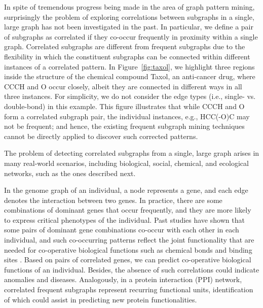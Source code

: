 {In spite of tremendous progress being made in the area of graph pattern mining, surprisingly the problem of exploring correlations between subgraphs
in a single, large graph has not been investigated in the past. In particular, we define a pair of subgraphs as correlated if
they co-occur frequently in proximity within a single graph. Correlated subgraphs are different from frequent subgraphs due to
the flexibility in which the constituent subgraphs can be connected within different instances of a correlated pattern. In Figure~\ref{fig:taxol},
we highlight three regions inside the structure of the chemical compound {\sf Taxol}, an anti-cancer drug, where {\sf CCCH} and {\sf O} occur closely,
albeit they are connected in different ways in all three instances. For simplicity, we do not consider the edge types (i.e., single- vs. double-bond)
in this example. This figure illustrates that while {\sf CCCH} and {\sf O} form a correlated subgraph pair, the individual instances, e.g., {\sf HCC(-O)C}
may not be frequent; and hence, the existing frequent subgraph mining techniques cannot be directly applied to discover such corrected patterns.


The problem of detecting correlated subgraphs from a single, large graph arises in many real-world scenarios, including biological,
social, chemical, and ecological networks, such as the ones described next.


 In the genome graph of an individual, a node represents a gene,
and each edge denotes the interaction between two genes. In practice, there are some combinations of dominant genes that
occur frequently, and they are more likely to express critical phenotypes of the individual.
Past studies have shown that some pairs of dominant gene combinations co-occur with each other in each individual,
and such co-occurring patterns reflect the joint functionality that are needed for co-operative biological functions such as chemical bonds
and binding sites \cite{LFSW14}. Based on pairs of correlated genes, we can predict co-operative biological functions of an
individual. Besides, the absence of such correlations could indicate anomalies and diseases.
Analogously, in a protein interaction (PPI) network, correlated frequent subgraphs represent recurring functional units,
identification of which could assist in predicting new protein functionalities.

}
